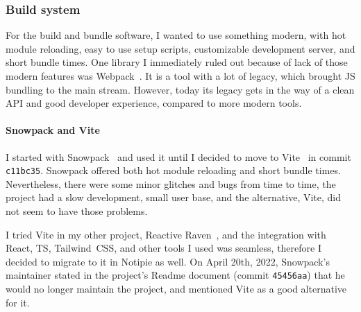 \subsubsection{Build system}\label{sec:build-system}

For the build and bundle software,
I wanted to use something modern,
with hot module reloading,
easy to use setup scripts,
customizable development server,
and short bundle times.
One library I immediately ruled out
because of lack of those modern features
was Webpack~\cite{koppers_webpack_2022}.
It is a tool with a lot of legacy,
which brought \ac{JS} bundling to the main stream.
However, today its legacy gets in the way
of a clean \ac{API} and good developer experience,
compared to more modern tools.

\paragraph*{Snowpack and Vite}\label{sec:snowpack-and-vite}

I started with Snowpack~\cite{schott_snowpack_2021}
and used it until I decided to move to Vite~\cite{you_vite_2022}
in commit \texttt{c11bc35}.
Snowpack offered both hot module reloading and short bundle times.
Nevertheless,
there were some minor glitches and bugs from time to time,
the project had a slow development,
small user base,
and the alternative, Vite,
did not seem to have those problems.

I tried Vite in my other project,
Reactive Raven~\cite{sewera_reactive_2022},
and the integration with
React,
\ac{TS},
Tailwind~CSS,
and other tools I used was seamless,
therefore I decided to migrate to it in Notipie as well.
On April 20th, 2022,
Snowpack's maintainer stated in the project's Readme document
(commit \texttt{45456aa})
that he would no longer maintain the project,
and mentioned Vite as a good alternative for it.

